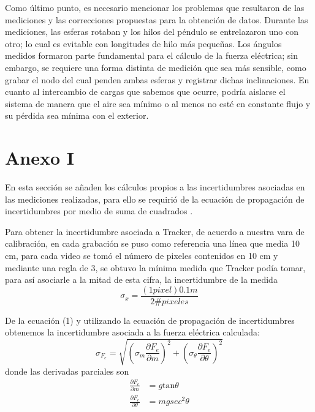 \documentclass[letterpaper, 11 pt]{article}
\begin{document}
\begin{multicols*}{2}
Como último punto, es necesario mencionar los problemas que resultaron de las mediciones y las correcciones propuestas para la obtención de datos. Durante las mediciones, las esferas rotaban y los hilos del péndulo se entrelazaron uno con otro; lo cual es evitable con longitudes de hilo más pequeñas. Los ángulos medidos formaron parte fundamental para el cálculo de la fuerza eléctrica; sin embargo, se requiere una forma distinta de medición que sea más sensible, como grabar el nodo del cual penden ambas esferas y registrar dichas inclinaciones. En cuanto al intercambio de cargas que sabemos que ocurre, podría aislarse el sistema de manera que el aire sea mínimo o al menos no esté en constante flujo y su pérdida sea mínima con el exterior.

\nocite{*}





\appendix
\section{Anexo I}

En esta sección se añaden los cálculos propios a las incertidumbres asociadas en las mediciones realizadas, para ello se requirió de la ecuación de propagación de incertidumbres por medio de suma de cuadrados \cite{beving}.

Para obtener la incertidumbre asociada a Tracker, de acuerdo a nuestra vara de calibración, en cada grabación se puso como referencia una línea que media 10 cm, para cada video se tomó el número de pixeles contenidos en 10 cm y mediante una regla de 3, se obtuvo la mínima medida que Tracker podía tomar, para así asociarle a la mitad de esta cifra, la incertidumbre de la medida
$$\sigma_x=\frac{(1\textit{pixel})0.1m}{2\# pixeles}$$

De la ecuación (1) y utilizando la ecuación de propagación de incertidumbres obtenemos la incertidumbre asociada a la fuerza eléctrica calculada:
\begin{equation}
    \sigma_{F_e}=\sqrt{\left(\sigma_m \frac{\partial F_e}{\partial m}\right)^2+\left(\sigma_\theta \frac{\partial F_e}{\partial \theta}\right)^2}
    \end{equation}
donde las derivadas parciales son \begin{equation*} 
\begin{split}
\frac{\partial F_e}{\partial m} &=g \text{tan}\theta \\  
\frac{\partial F_e}{\partial \theta}&=mgsec^2\theta 
\end{split}
\end{equation*}


\end{multicols*}
\end{document}
